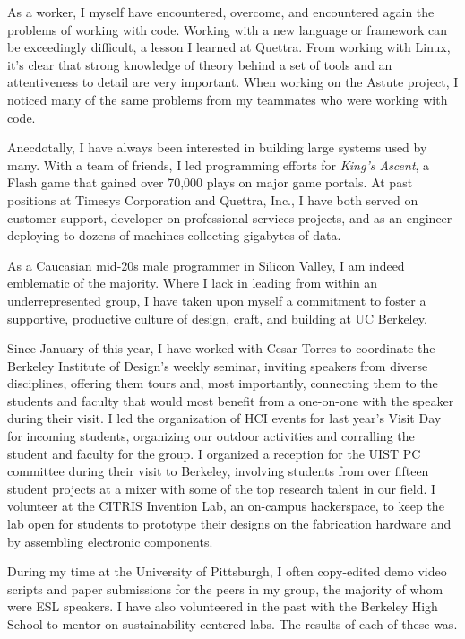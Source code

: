 \documentclass[12pt]{memoir}
\begin{document}

As a worker, I myself have encountered, overcome, and encountered again the problems of working with code.
Working with a new language or framework can be exceedingly difficult, a lesson I learned at Quettra.
From working with Linux, it's clear that strong knowledge of theory behind a set of tools and an attentiveness to detail are very important.
When working on the Astute project, I noticed many of the same problems from my teammates who were working with code.

Anecdotally, I have always been interested in building large systems used by many.
With a team of friends, I led programming efforts for \emph{King's Ascent}, a Flash game that gained over 70,000 plays on major game portals.
At past positions at Timesys Corporation and Quettra, Inc., I have both served on customer support, developer on professional services projects, and as an engineer deploying to dozens of machines collecting gigabytes of data.

As a Caucasian mid-20s male programmer in Silicon Valley, I am indeed emblematic of the majority.
Where I lack in leading from within an underrepresented group, I have taken upon myself a commitment to foster a supportive, productive culture of design, craft, and building at UC Berkeley.

Since January of this year, I have worked with Cesar Torres to coordinate the Berkeley Institute of Design's weekly seminar, inviting speakers from diverse disciplines, offering them tours and, most importantly, connecting them to the students and faculty that would most benefit from a one-on-one with the speaker during their visit.
I led the organization of HCI events for last year's Visit Day for incoming students, organizing our outdoor activities and corralling the student and faculty for the group.
I organized a reception for the UIST PC committee during their visit to Berkeley, involving students from over fifteen student projects at a mixer with some of the top research talent in our field.
I volunteer at the CITRIS Invention Lab, an on-campus hackerspace, to keep the lab open for students to prototype their designs on the fabrication hardware and by assembling electronic components.

During my time at the University of Pittsburgh, I often copy-edited demo video scripts and paper submissions for the peers in my group, the majority of whom were ESL speakers.
I have also volunteered in the past with the Berkeley High School to mentor on sustainability-centered labs.
The results of each of these was.
\end{document}
